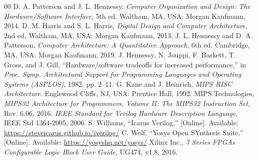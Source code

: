 \documentclass[conference]{IEEEtran}
\begin{document}
\begin{thebibliography}{00}
 D. A. Patterson and J. L. Hennessy, \textit{Computer Organization and Design: The Hardware/Software Interface}, 5th ed. Waltham, MA, USA: Morgan Kaufmann, 2014.
 D. M. Harris and S. L. Harris, \textit{Digital Design and Computer Architecture}, 2nd ed. Waltham, MA, USA: Morgan Kaufmann, 2013.
 J. L. Hennessy and D. A. Patterson, \textit{Computer Architecture: A Quantitative Approach}, 6th ed. Cambridge, MA, USA: Morgan Kaufmann, 2019.
 J. Hennessy, N. Jouppi, F. Baskett, T. Gross, and J. Gill, ``Hardware/software tradeoffs for increased performance,'' in \textit{Proc. Symp. Architectural Support for Programming Languages and Operating Systems (ASPLOS)}, 1982, pp. 2--11.
 G. Kane and J. Heinrich, \textit{MIPS RISC Architecture}. Englewood Cliffs, NJ, USA: Prentice Hall, 1992.
 MIPS Technologies, \textit{MIPS32 Architecture for Programmers, Volume II: The MIPS32 Instruction Set}, Rev. 6.06, 2016.
 \textit{IEEE Standard for Verilog Hardware Description Language}, IEEE Std 1364-2005, 2006.
 S. Williams, ``Icarus Verilog,'' [Online]. Available: \url{https://steveicarus.github.io/iverilog/}
 C. Wolf, ``Yosys Open SYnthesis Suite,'' [Online]. Available: \url{https://yosyshq.net/yosys/}
 Xilinx Inc., \textit{7 Series FPGAs Configurable Logic Block User Guide}, UG474, v1.8, 2016.
\end{thebibliography}
\end{document}
